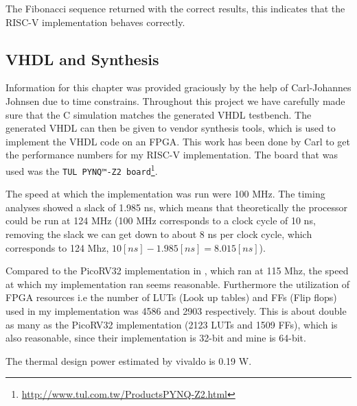         The Fibonacci sequence returned with the correct results, this indicates that the RISC-V implementation behaves correctly.
        
        
    \subsection{VHDL and Synthesis}
        Information for this chapter was provided graciously by the help of Carl-Johannes Johnsen due to time constrains.
        Throughout this project we have carefully made sure that the C simulation matches the generated VHDL testbench. The generated VHDL can then be given to vendor synthesis tools, which is used to implement the VHDL code on an FPGA.
        This work has been done by Carl to get the performance numbers for my RISC-V implementation. The board that was used was the \texttt{TUL PYNQ™-Z2 board}\footnote{\url{http://www.tul.com.tw/ProductsPYNQ-Z2.html}}. 
        
        The speed at which the implementation was run were 100 MHz. The timing analyses showed a slack of 1.985 ns, which means that theoretically the processor could be run at 124 MHz (100 MHz corresponds to a clock cycle of 10 ns, removing the slack we can get down to about 8 ns per clock cycle, which corresponds to 124 Mhz, $10[ns]-1.985[ns]=8.015[ns]$). 
        
        Compared to the PicoRV32 implementation in \cite{8760205}, which ran at 115 Mhz, the speed at which my implementation ran seems reasonable. Furthermore the utilization of FPGA resources i.e  the number of LUTs (Look up tables) and FFs (Flip flops) used in my implementation was 4586 and 2903 respectively. This is about double as many as the PicoRV32 implementation (2123 LUTs and 1509 FFs), which is also reasonable, since their implementation is 32-bit and mine is 64-bit.
        
        The thermal design power estimated by vivaldo is 0.19 W.
        
        
        
        
        
    